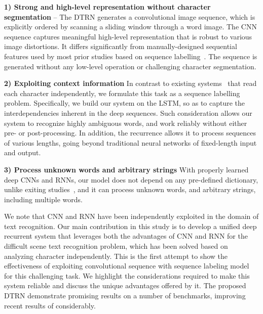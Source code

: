\documentclass[letterpaper]{article}
\begin{document}
\noindent\textbf{1) Strong and high-level representation without character segmentation} --
%
The DTRN generates a convolutional image sequence, which is explicitly ordered by scanning a sliding window through a word image. The CNN sequence captures meaningful high-level representation that is robust to various image distortions. It differs significantly from manually-designed sequential features used by most prior studies based on sequence labelling~\cite{Breuel2013,Graves2009,Su2014}. The sequence is generated without any low-level operation or challenging character segmentation.

\noindent\textbf{2) Exploiting context information}
In contrast to existing systems~\cite{Bissacco2013,Jaderberg2014,Wang2012} that read each character independently, we formulate this task as a sequence labelling problem.
%
Specifically, we build our system on the LSTM, so as to capture the interdependencies inherent in the deep sequences. Such consideration allows our system to recognize highly ambiguous words, and work reliably without either pre- or post-processing. In addition, the recurrence allows it to process sequences of various lengths, going beyond traditional neural networks of fixed-length input and output.

\noindent\textbf{3) Process unknown words and arbitrary strings}
%
With properly learned deep CNNs and RNNs, our model does not depend on any pre-defined dictionary, unlike exiting studies~\cite{Jaderberg2015b,Jaderberg2014,Wang2012}, and  it can process unknown words, and arbitrary strings, including multiple words.


We note that CNN and RNN have been independently exploited in the domain of text recognition. Our main contribution in this study is to develop a unified deep recurrent system that leverages both the advantages of CNN and RNN for the difficult scene text recognition problem, which has been solved based on analyzing character independently. This is the first attempt to show the effectiveness of exploiting convolutional sequence with sequence labeling model for this challenging task. We highlight the considerations required to make this system reliable and discuss the unique advantages offered by it.
%
The proposed DTRN demonstrate promising results on a number of benchmarks, improving recent results of \cite{Jaderberg2014,Almazan2014} considerably.
\end{document}
